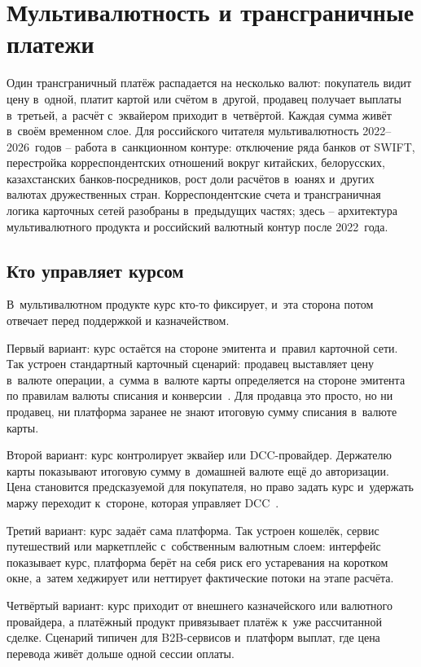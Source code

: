 
\chapter{Мультивалютность и трансграничные платежи}\label{ch:multicurrency}
Один трансграничный платёж распадается на несколько
валют: покупатель видит цену в~одной, платит картой
или счётом в~другой, продавец получает выплаты в~третьей,
а~расчёт с~эквайером приходит в~четвёртой. Каждая сумма
живёт в~своём временном слое. Для российского читателя
мультивалютность 2022--2026~годов -- работа в~санкционном
контуре: отключение ряда банков от SWIFT, перестройка
корреспондентских отношений вокруг китайских, белорусских,
казахстанских банков-посредников, рост доли расчётов
в~юанях и~других валютах дружественных стран. Корреспондентские
счета и трансграничная логика карточных сетей разобраны
в~предыдущих частях; здесь -- архитектура мультивалютного
продукта и российский валютный контур после 2022~года.

\section{Кто управляет курсом}\label{sec:mc-currencies}

В~мультивалютном продукте курс кто-то фиксирует, и~эта
сторона потом отвечает перед поддержкой и казначейством.

Первый вариант: курс остаётся на стороне эмитента и~правил
карточной сети. Так устроен стандартный карточный сценарий:
продавец выставляет цену в~валюте операции, а~сумма в~валюте
карты определяется на стороне эмитента по правилам валюты
списания и конверсии~\cite{visa-core-rules,mc-dcc-guide}.
Для продавца это просто, но ни продавец, ни платформа
заранее не знают итоговую сумму списания в~валюте карты.

Второй вариант: курс контролирует эквайер или DCC-провайдер.
Держателю карты показывают итоговую сумму в~домашней валюте
ещё до авторизации. Цена становится предсказуемой
для покупателя, но право задать курс и~удержать маржу
переходит к~стороне, которая управляет DCC~\cite{visa-core-rules,mc-dcc-guide}.

Третий вариант: курс задаёт сама платформа. Так устроен
кошелёк, сервис путешествий или маркетплейс с~собственным
валютным слоем: интерфейс показывает курс, платформа берёт
на себя риск его устаревания на коротком окне, а~затем
хеджирует или неттирует фактические потоки
на этапе расчёта.

Четвёртый вариант: курс приходит от внешнего казначейского
или валютного провайдера, а платёжный продукт привязывает
платёж к~уже рассчитанной сделке. Сценарий типичен
для B2B-сервисов и~платформ выплат, где цена перевода живёт
дольше одной сессии оплаты.

